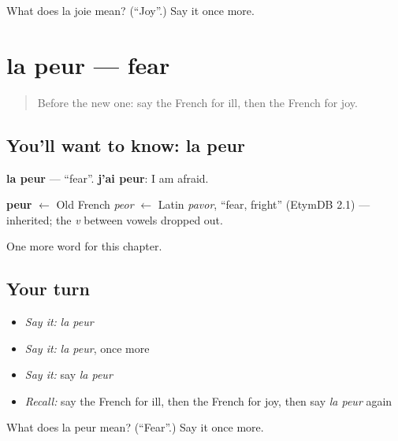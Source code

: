 \begin{tcolorbox}[breakable,colback=teal!4,colframe=teal!35!black,title={Before you move on}]
What does la joie mean? (\textquotedblleft{}Joy\textquotedblright{}.) Say it once more.
\end{tcolorbox}
\section[la peur]{la peur — fear}

\label{lesson:FR-C55-peur}



\begin{quote}
Before the new one: say the French for ill, then the French for joy.
\end{quote}

\subsection*{You'll want to know: la peur}
\textbf{la peur} — \textquotedblleft{}fear\textquotedblright{}. \textbf{j'ai peur}: I am afraid.

\begin{cousinweb}
\textbf{peur} $\leftarrow$ Old French \emph{peor} $\leftarrow$ Latin \emph{pavor}, \textquotedblleft{}fear, fright\textquotedblright{} (EtymDB 2.1) — inherited; the \emph{v} between vowels dropped out.
\end{cousinweb}

\begin{grammarlens}[title={What you've built}]
One more word for this chapter.
\end{grammarlens}

\subsection*{Your turn}
\begin{itemize}
\raggedright
  \item \emph{Say it:} \emph{la peur}
  \item \emph{Say it:} \emph{la peur}, once more
  \item \emph{Say it:} say \emph{la peur}
  \item \emph{Recall:} say the French for ill, then the French for joy, then say \emph{la peur} again
\end{itemize}

\begin{tcolorbox}[breakable,colback=teal!4,colframe=teal!35!black,title={Before you move on}]
What does la peur mean? (\textquotedblleft{}Fear\textquotedblright{}.) Say it once more.
\end{tcolorbox}
